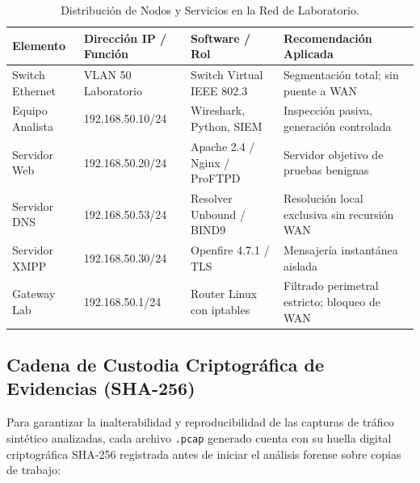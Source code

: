 \documentclass[11pt,letterpaper]{article}
\begin{document}
\begin{table}[H]
    \centering
    \small
    \begin{tabular}{@{}llll@{}}
        \toprule
        \textbf{Elemento} & \textbf{Dirección IP / Función} & \textbf{Software / Rol} & \textbf{Recomendación Aplicada} \\
        \midrule
        Switch Ethernet & VLAN 50 Laboratorio & Switch Virtual IEEE 802.3 & Segmentación total; sin puente a WAN \\
        Equipo Analista & 192.168.50.10/24 & Wireshark, Python, SIEM & Inspección pasiva, generación controlada \\
        Servidor Web & 192.168.50.20/24 & Apache 2.4 / Nginx / ProFTPD & Servidor objetivo de pruebas benignas \\
        Servidor DNS & 192.168.50.53/24 & Resolver Unbound / BIND9 & Resolución local exclusiva sin recursión WAN \\
        Servidor XMPP & 192.168.50.30/24 & Openfire 4.7.1 / TLS & Mensajería instantánea aislada \\
        Gateway Lab & 192.168.50.1/24 & Router Linux con iptables & Filtrado perimetral estricto; bloqueo de WAN \\
        \bottomrule
    \end{tabular}
    \caption{Distribución de Nodos y Servicios en la Red de Laboratorio.}
\end{table}

\subsection{Cadena de Custodia Criptográfica de Evidencias (SHA-256)}
Para garantizar la inalterabilidad y reproducibilidad de las capturas de tráfico sintético analizadas, cada archivo \texttt{.pcap} generado cuenta con su huella digital criptográfica SHA-256 registrada antes de iniciar el análisis forense sobre copias de trabajo:
\end{document}
